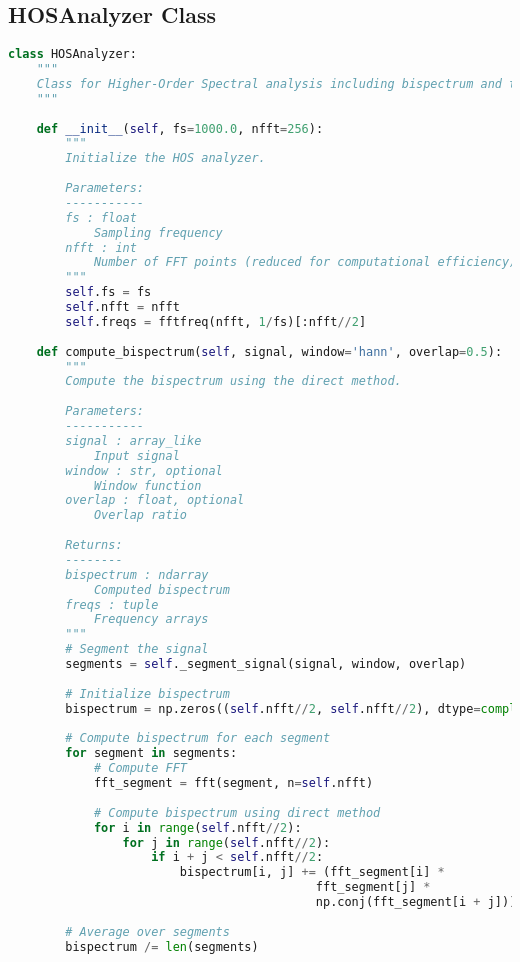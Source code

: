 \subsection{HOSAnalyzer Class}

\begin{lstlisting}[language=Python, caption=HOSAnalyzer class for higher-order spectral analysis]
class HOSAnalyzer:
    """
    Class for Higher-Order Spectral analysis including bispectrum and trispectrum.
    """
    
    def __init__(self, fs=1000.0, nfft=256):
        """
        Initialize the HOS analyzer.
        
        Parameters:
        -----------
        fs : float
            Sampling frequency
        nfft : int
            Number of FFT points (reduced for computational efficiency)
        """
        self.fs = fs
        self.nfft = nfft
        self.freqs = fftfreq(nfft, 1/fs)[:nfft//2]
        
    def compute_bispectrum(self, signal, window='hann', overlap=0.5):
        """
        Compute the bispectrum using the direct method.
        
        Parameters:
        -----------
        signal : array_like
            Input signal
        window : str, optional
            Window function
        overlap : float, optional
            Overlap ratio
            
        Returns:
        --------
        bispectrum : ndarray
            Computed bispectrum
        freqs : tuple
            Frequency arrays
        """
        # Segment the signal
        segments = self._segment_signal(signal, window, overlap)
        
        # Initialize bispectrum
        bispectrum = np.zeros((self.nfft//2, self.nfft//2), dtype=complex)
        
        # Compute bispectrum for each segment
        for segment in segments:
            # Compute FFT
            fft_segment = fft(segment, n=self.nfft)
            
            # Compute bispectrum using direct method
            for i in range(self.nfft//2):
                for j in range(self.nfft//2):
                    if i + j < self.nfft//2:
                        bispectrum[i, j] += (fft_segment[i] * 
                                           fft_segment[j] * 
                                           np.conj(fft_segment[i + j]))
        
        # Average over segments
        bispectrum /= len(segments)
        

\end{lstlisting}
